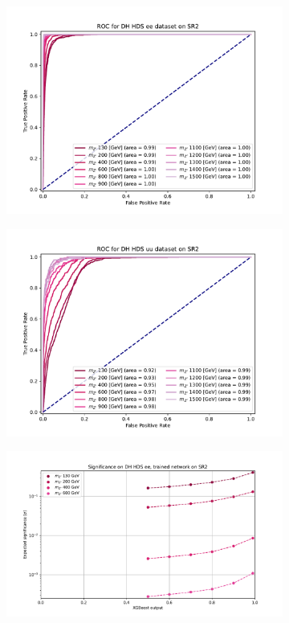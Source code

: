 \documentclass[12pt, a4paper]{book}
\begin{document}
\begin{figure}[!ht]
\begin{subfigure}[b]{0.49\textwidth}
      \includegraphics[width=1\textwidth]{XGBoost/Model_independent/100-150/DH_HDS/ROC_ee.pdf}
   \end{subfigure}
   \hfill
   \begin{subfigure}[b]{0.49\textwidth}
      \centering
      \includegraphics[width=1\textwidth]{XGBoost/Model_independent/100-150/DH_HDS/ROC_uu.pdf}
   \end{subfigure}
   \hfill
	\begin{subfigure}[b]{0.49\textwidth}
      \centering
      \includegraphics[width=1\textwidth]{XGBoost/Model_independent/100-150/DH_HDS/EXP_SIG_ee.pdf}

\end{subfigure}
\end{figure}
\end{document}
